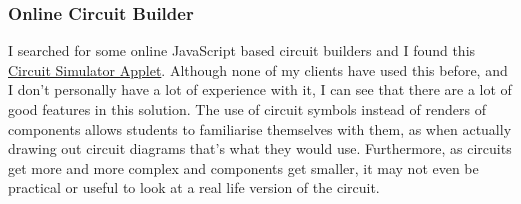 \documentclass[tikz, 11pt]{article}
\begin{document}
            \subsubsection{Online Circuit Builder}
                I searched for some online JavaScript based circuit builders and I found this \href{https://www.falstad.com/circuit/}{Circuit Simulator Applet}. Although none of my clients have used this before, and I don't personally have a lot of experience with it, I can see that there are a lot of good features in this solution. The use of circuit symbols instead of renders of components allows students to familiarise themselves with them, as when actually drawing out circuit diagrams that's what they would use. Furthermore, as circuits get more and more complex and components get smaller, it may not even be practical or useful to look at a real life version of the circuit. 


\end{document}

